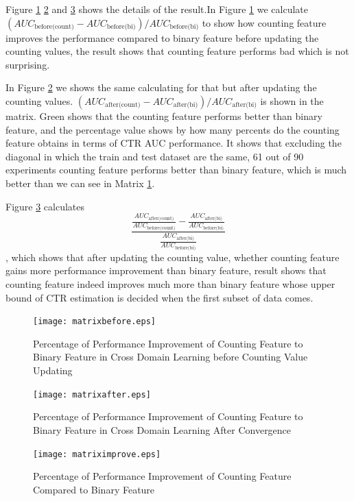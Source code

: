 Figure \ref{fig:matrixbefore} \ref{fig:matrixafter} and \ref{fig:matriximprove} shows the details of the result.In Figure \ref{fig:matrixbefore} we calculate \((AUC_{\text{before(count)}} - AUC_{\text{before(bi)}}) / AUC_{\text{before(bi)}} \) to show how counting feature improves the performance compared to binary feature before updating the counting values, the result shows that counting feature performs bad which is not surprising. 

In Figure \ref{fig:matrixafter} we shows the same calculating for that but after updating the counting values.  \((AUC_{\text{after(count)}} - AUC_{\text{after(bi)}}) / AUC_{\text{after(bi)}} \) is shown in the matrix. Green shows that the counting feature performs better than binary feature, and the percentage value shows by how many percents do the counting feature obtains in terms of CTR AUC performance. It shows that excluding the diagonal in which the train and test dataset are the same, 61 out of 90 experiments counting feature performs better than binary feature, which is much better than we can see in Matrix \ref{fig:matrixbefore}.

Figure \ref{fig:matriximprove} calculates 
\begin{equation}
  \frac {\frac{AUC_{\text{after(count)}}}{AUC_{\text{before(count)}}} - \frac{AUC_{\text{after(bi)}}}{AUC_{\text{before(bi)}}}}  {\frac{AUC_{\text{after(bi)}}}{AUC_{\text{before(bi)}}}} 
\end{equation}
, which shows that after updating the counting value, whether counting feature gains more performance improvement than binary feature, result shows that counting feature indeed improves much more than binary feature whose upper bound of CTR estimation is decided when the first subset of data comes. 

\begin{figure}[t]
\centering
\texttt{[image: matrixbefore.eps]}
\caption{Percentage of Performance Improvement of Counting Feature to Binary Feature in Cross Domain Learning before Counting Value Updating}
\label{fig:matrixbefore}
\end{figure}

\begin{figure}[t]
\centering
\texttt{[image: matrixafter.eps]}
\caption{Percentage of Performance Improvement of Counting Feature to Binary Feature in Cross Domain Learning After Convergence}
\label{fig:matrixafter}
\end{figure}

\begin{figure}[t]
\centering
\texttt{[image: matriximprove.eps]}
\caption{Percentage of Performance Improvement of Counting Feature Compared to Binary Feature}
\label{fig:matriximprove}
\end{figure}

